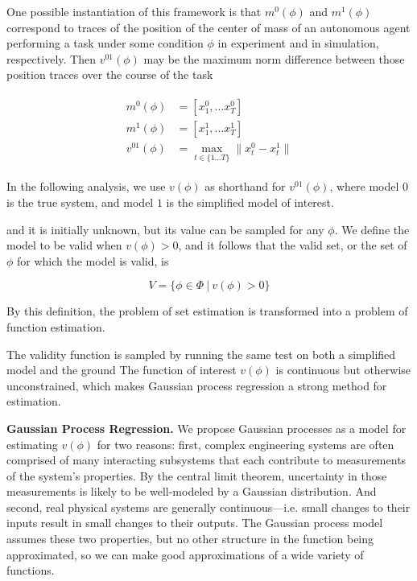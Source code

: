 \documentclass{amsart}
\begin{document}
One possible instantiation of this framework is that $m^0(\phi)$ and $m^1(\phi)$ correspond to traces of the position of the center of mass of an autonomous agent performing a task under some condition $\phi$ in experiment and in simulation, respectively. Then $v^{01}(\phi)$ may be the maximum norm difference between those position traces over the course of the task

\begin{align}
\begin{split}
    m^0(\phi)&=[x^0_1,...x^0_T] \\
    m^1(\phi)&=[x^1_1,...x^1_T] \\
    v^{01}(\phi) &= \max\limits_{t\in\{1...T\}} \|x^0_t-x^1_t\|
\end{split}
\end{align}
\smallskip

In the following analysis, we use $v(\phi)$ as shorthand for $v^{01}(\phi)$, where model $0$ is the true system, and model $1$ is the simplified model of interest.

and it is initially unknown, but its value can be sampled for any $\phi$. We define the model to be valid when $v(\phi)>0$, and it follows that the valid set, or the set of $\phi$ for which the model is valid, is

\begin{equation}
    V=\{\phi\in\Phi\ |\ v(\phi)>0\}
\end{equation}

By this definition, the problem of set estimation is transformed into a problem of function estimation.

The validity function is sampled by running the same test on both a simplified model and the ground The function of interest $v(\phi)$ is continuous but otherwise unconstrained, which makes Gaussian process regression a strong method for estimation. 
\linebreak

\noindent\textbf{Gaussian Process Regression.} We propose Gaussian processes as a model for estimating $v(\phi)$ for two reasons: first, complex engineering systems are often comprised of many interacting subsystems that each contribute to measurements of the system's properties. By the central limit theorem, uncertainty in those measurements is likely to be well-modeled by a Gaussian distribution. And second, real physical systems are generally continuous---i.e. small changes to their inputs result in small changes to their outputs. The Gaussian process model assumes these two properties, but no other structure in the function being approximated, so we can make good approximations of a wide variety of functions.
\end{document}
